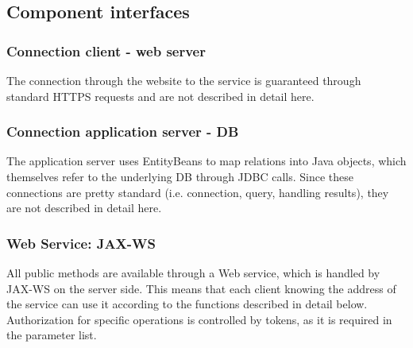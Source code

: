 \pagebreak
\subsection{Component interfaces}
\label{sub:component_interfaces}

\subsubsection{Connection client - web server} %
\label{ssub:https}
The connection through the website to the service is guaranteed through standard HTTPS requests and are not described in detail here.

\subsubsection{Connection application server - DB} %
\label{ssub:connection_application_server_db}
The application server uses EntityBeans to map relations into Java objects, which themselves refer to the underlying DB through JDBC calls. Since these connections are pretty standard (i.e. connection, query, handling results), they are not described in detail here.

\subsubsection{Web Service: JAX-WS} %
\label{ssub:web_service_jax_ws}
All public methods are available through a Web service, which is handled by JAX-WS on the server side. This means that each client knowing the address of the service can use it according to the functions described in detail below. Authorization for specific operations is controlled by tokens, as it is required in the parameter list.

\pagebreak
